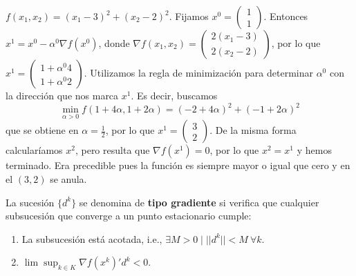 \documentclass[MIOP.tex]{subfiles}
\begin{document}
\begin{ej}
$f(x_1,x_2)=(x_1-3)^2+(x_2-2)^2$. Fijamos $x^0=\begin{pmatrix}
1\\
1
\end{pmatrix}$. Entonces $x^1=x^0-\alpha^0\nabla f(x^0)$, donde $\nabla f(x_1,x_2)=\begin{pmatrix}
2(x_1-3)\\
2(x_2-2)
\end{pmatrix}$, por lo que $x^1=\begin{pmatrix}
1+\alpha^0 4\\
1+\alpha^0 2
\end{pmatrix}$. Utilizamos la regla de minimización para determinar $\alpha^0$ con la dirección que nos marca $x^1$. Es decir, buscamos
$$\min_{\alpha>0}f(1+4\alpha,1+2\alpha)=(-2+4\alpha)^2+(-1+2\alpha)^2$$
que se obtiene en $\alpha=\frac{1}{2}$, por lo que $x^1=\begin{pmatrix}
3\\
2
\end{pmatrix}$. De la misma forma calcularíamos $x^2$, pero resulta que $\nabla f(x^1)=0$, por lo que $x^2=x^1$ y hemos terminado. Era precedible pues la función es siempre mayor o igual que cero y en el $(3,2)$ se anula.
\end{ej}

\begin{defi}
La sucesión $\{d^k\}$ se denomina de \textbf{tipo gradiente} si verifica que cualquier subsucesión que converge a un punto estacionario cumple: 
\begin{enumerate}
\item La subsucesión está acotada, i.e., $\exists M>0\mid ||d^k||<M\ \forall k$. 
\item $\lim\sup_{k\in K}\nabla f(x^k)'d^k<0$. \label{gradiente}
\end{enumerate}
\end{defi}
\end{document}
